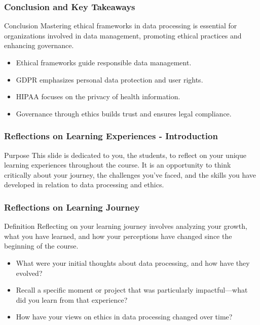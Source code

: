 \documentclass[aspectratio=169]{beamer}
\begin{document}
\begin{frame}[fragile]
    \frametitle{Conclusion and Key Takeaways}
    \begin{block}{Conclusion}
        Mastering ethical frameworks in data processing is essential for organizations involved in data management, promoting ethical practices and enhancing governance.
    \end{block}
    \begin{itemize}
        \item Ethical frameworks guide responsible data management.
        \item GDPR emphasizes personal data protection and user rights.
        \item HIPAA focuses on the privacy of health information.
        \item Governance through ethics builds trust and ensures legal compliance.
    \end{itemize}
\end{frame}

\begin{frame}[fragile]
    \frametitle{Reflections on Learning Experiences - Introduction}
    \begin{block}{Purpose}
        This slide is dedicated to you, the students, to reflect on your unique learning experiences throughout the course. It is an opportunity to think critically about your journey, the challenges you've faced, and the skills you have developed in relation to data processing and ethics.
    \end{block}
\end{frame}

\begin{frame}[fragile]
    \frametitle{Reflections on Learning Journey}
    \begin{block}{Definition}
        Reflecting on your learning journey involves analyzing your growth, what you have learned, and how your perceptions have changed since the beginning of the course.
    \end{block}
    \begin{itemize}
        \item What were your initial thoughts about data processing, and how have they evolved?
        \item Recall a specific moment or project that was particularly impactful—what did you learn from that experience?
        \item How have your views on ethics in data processing changed over time?
    \end{itemize}
\end{frame}
\end{document}
